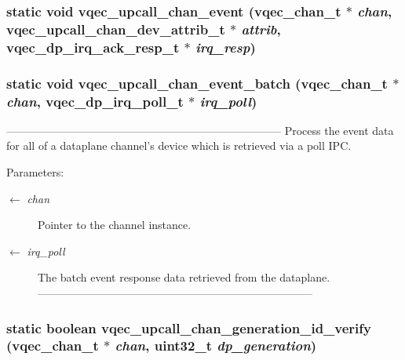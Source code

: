 \subsubsection{\setlength{\rightskip}{0pt plus 5cm}static void vqec\_\-upcall\_\-chan\_\-event (\bf{vqec\_\-chan\_\-t} $\ast$ {\em chan}, \bf{vqec\_\-upcall\_\-chan\_\-dev\_\-attrib\_\-t} $\ast$ {\em attrib}, vqec\_\-dp\_\-irq\_\-ack\_\-resp\_\-t $\ast$ {\em irq\_\-resp})\hspace{0.3cm}{\tt  [static]}}\label{vqec__upcall__event_8c_5cbd1ced1597e18287d1e0983d889231}


\subsubsection{\setlength{\rightskip}{0pt plus 5cm}static void vqec\_\-upcall\_\-chan\_\-event\_\-batch (\bf{vqec\_\-chan\_\-t} $\ast$ {\em chan}, vqec\_\-dp\_\-irq\_\-poll\_\-t $\ast$ {\em irq\_\-poll})\hspace{0.3cm}{\tt  [static]}}\label{vqec__upcall__event_8c_72bbd4ccbd8ec91774a8d650978cd5f4}


--------------------------------------------------------------------------- Process the event data for all of a dataplane channel's device which is retrieved via a poll IPC.

\begin{Desc}
\item[Parameters:]
\begin{description}
\item[\mbox{$\leftarrow$} {\em chan}]Pointer to the channel instance. \item[\mbox{$\leftarrow$} {\em irq\_\-poll}]The batch event response data retrieved from the dataplane. --------------------------------------------------------------------------- \end{description}
\end{Desc}
\subsubsection{\setlength{\rightskip}{0pt plus 5cm}static boolean vqec\_\-upcall\_\-chan\_\-generation\_\-id\_\-verify (\bf{vqec\_\-chan\_\-t} $\ast$ {\em chan}, uint32\_\-t {\em dp\_\-generation})\hspace{0.3cm}{\tt  [inline, static]}}\label{vqec__upcall__event_8c_23ab93d8fe83ac6e5fcfbdcd827afd5f}


